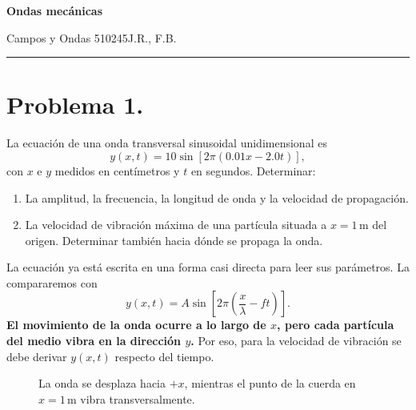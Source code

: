 \documentclass[11pt]{article}
\newcommand{\encabezado}[3]{%
{\Large\bfseries #1\par}
\vspace{2pt}
{\normalsize #2\hfill #3\par}
\vspace{6pt}\hrule\vspace{8pt}}
\begin{document}
\encabezado{Ondas mecánicas}{Campos y Ondas 510245}{J.R., F.B.}
\shorthandoff{<>}

\section*{Problema 1.}
La ecuaci\'on de una onda transversal sinusoidal unidimensional es
\begin{equation*}
    y(x,t)=10\sin\left[2\pi(0.01x-2.0t)\right],
\end{equation*}
con $x$ e $y$ medidos en cent\'imetros y $t$ en segundos. Determinar:
\begin{enumerate}[label=(\alph*)]
    \item La amplitud, la frecuencia, la longitud de onda y la velocidad de propagaci\'on.
    \item La velocidad de vibraci\'on m\'axima de una part\'icula situada a $x=1\,\mathrm{m}$ del origen. Determinar tambi\'en hacia d\'onde se propaga la onda.
\end{enumerate}


La ecuaci\'on ya est\'a escrita en una forma casi directa para leer sus par\'ametros. La compararemos con
\begin{equation*}
    y(x,t)=A\sin\left[2\pi\left(\frac{x}{\lambda}-ft\right)\right].
\end{equation*}
\textbf{El movimiento de la onda ocurre a lo largo de $x$, pero cada part\'icula del medio vibra en la direcci\'on $y$.} Por eso, para la velocidad de vibraci\'on se debe derivar $y(x,t)$ respecto del tiempo.


\begin{figure}[H]
\centering
{}
\caption{La onda se desplaza hacia $+x$, mientras el punto de la cuerda en $x=1\,\mathrm{m}$ vibra transversalmente.}
\label{fig:p1_onda}
\end{figure}
\end{document}
